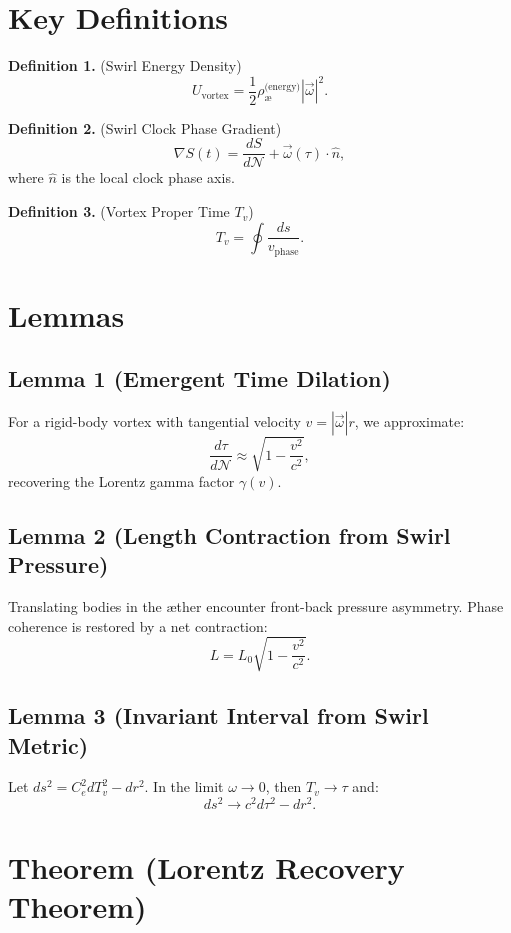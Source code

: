 \documentclass[11pt]{article}
\begin{document}
    \section{Key Definitions}

    \textbf{Definition 1.} (Swirl Energy Density)
    \[
        U_{\text{vortex}} = \frac{1}{2} \rho_{\text{\ae}}^{\text{(energy)}} |\vec{\omega}|^2.
    \]

    \textbf{Definition 2.} (Swirl Clock Phase Gradient)
    \[
        \nabla S(t) = \frac{dS}{d\mathcal{N}} + \vec{\omega}(\tau) \cdot \hat{n},
    \]
    where \( \hat{n} \) is the local clock phase axis.

    \textbf{Definition 3.} (Vortex Proper Time \( T_v \))
    \[
        T_v = \oint \frac{ds}{v_\text{phase}}.
    \]

    \section{Lemmas}

    \subsection*{Lemma 1 (Emergent Time Dilation)}
    For a rigid-body vortex with tangential velocity \( v = |\vec{\omega}| r \), we approximate:
    \[
        \frac{d\tau}{d\mathcal{N}} \approx \sqrt{1 - \frac{v^2}{c^2}},
    \]
    recovering the Lorentz gamma factor \( \gamma(v) \).

    \subsection*{Lemma 2 (Length Contraction from Swirl Pressure)}
    Translating bodies in the æther encounter front-back pressure asymmetry. Phase coherence is restored by a net contraction:
    \[
        L = L_0 \sqrt{1 - \frac{v^2}{c^2}}.
    \]

    \subsection*{Lemma 3 (Invariant Interval from Swirl Metric)}
    Let \( ds^2 = C_e^2 dT_v^2 - dr^2 \). In the limit \( \omega \to 0 \), then \( T_v \to \tau \) and:
    \[
        ds^2 \to c^2 d\tau^2 - dr^2.
    \]

    \section{Theorem (Lorentz Recovery Theorem)}
\end{document}
